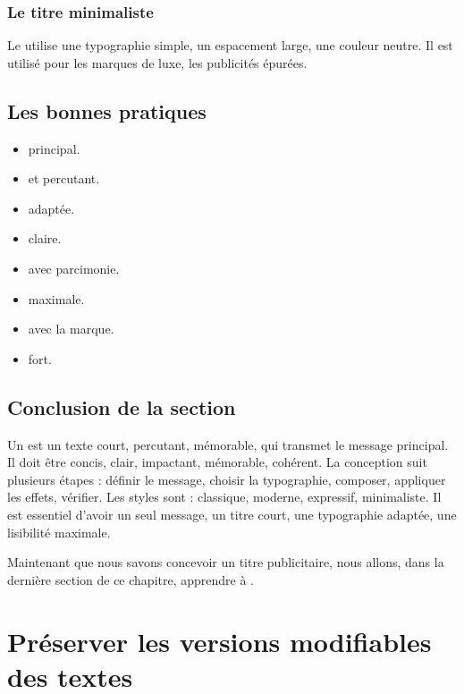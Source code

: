 \subsubsection{Le titre minimaliste}

Le  utilise une typographie simple, un espacement large, une couleur neutre. Il est utilisé pour les marques de luxe, les publicités épurées.

\subsection{Les bonnes pratiques}

\begin{itemize}
    \item {} principal.
    \item {} et percutant.
    \item {} adaptée.
    \item {} claire.
    \item {} avec parcimonie.
    \item {} maximale.
    \item {} avec la marque.
    \item {} fort.
\end{itemize}

\subsection*{Conclusion de la section}

Un  est un texte court, percutant, mémorable, qui transmet le message principal. Il doit être concis, clair, impactant, mémorable, cohérent. La conception suit plusieurs étapes : définir le message, choisir la typographie, composer, appliquer les effets, vérifier. Les styles sont : classique, moderne, expressif, minimaliste. Il est essentiel d'avoir un seul message, un titre court, une typographie adaptée, une lisibilité maximale.

Maintenant que nous savons concevoir un titre publicitaire, nous allons, dans la dernière section de ce chapitre, apprendre à .

\section{Préserver les versions modifiables des textes}

